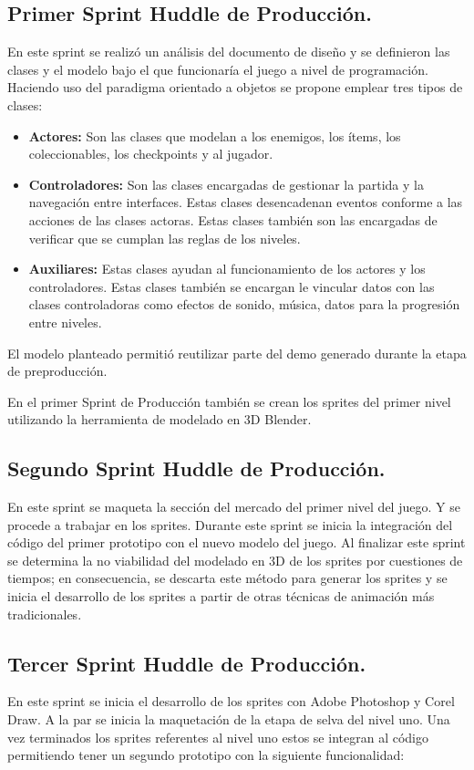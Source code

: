 \subsection{Primer Sprint Huddle de Producción.}
En este sprint se realizó un análisis del documento de diseño y se definieron las 
clases y el modelo bajo el que funcionaría el juego a nivel de programación. 
Haciendo uso del paradigma orientado a objetos se propone emplear tres tipos de clases:

\begin{itemize}
	\item \textbf{Actores:} Son las clases que modelan a los enemigos, los ítems, 
	los coleccionables, los checkpoints y al jugador.
	\item \textbf{Controladores:} Son las clases encargadas de gestionar la partida 
	y la navegación entre interfaces. Estas clases desencadenan eventos conforme a 
	las acciones de las clases actoras. Estas clases también son las encargadas de 
	verificar que se cumplan las reglas de los niveles.
	\item \textbf{Auxiliares:} Estas clases ayudan al funcionamiento de los actores 
	y los controladores. Estas clases también se encargan le vincular datos con 
	las clases controladoras como efectos de sonido, música, datos para la 
	progresión entre niveles.
\end{itemize}

El modelo planteado permitió reutilizar parte del demo generado durante la etapa 
de preproducción. 
\\
\par
En el primer Sprint de Producción también se crean los sprites del primer nivel utilizando la herramienta de modelado en 3D Blender.

\subsection{Segundo Sprint Huddle de Producción.}
En este sprint se maqueta la sección del mercado del primer nivel del juego. Y 
se procede a trabajar en los sprites. Durante este sprint se inicia la 
integración del código del primer prototipo con el nuevo modelo del juego. Al 
finalizar este sprint se determina la no viabilidad del modelado en 3D de los 
sprites por cuestiones de tiempos; en consecuencia, se descarta este método para 
generar los sprites y se inicia el desarrollo de los sprites a partir de otras 
técnicas de animación más tradicionales.

\subsection{Tercer Sprint Huddle de Producción.}
En este sprint se inicia el desarrollo de los sprites con Adobe Photoshop y Corel 
Draw. A la par se inicia la maquetación de la etapa de selva del nivel uno. Una 
vez terminados los sprites referentes al nivel uno estos se integran al código 
permitiendo tener un segundo prototipo con la siguiente funcionalidad:

